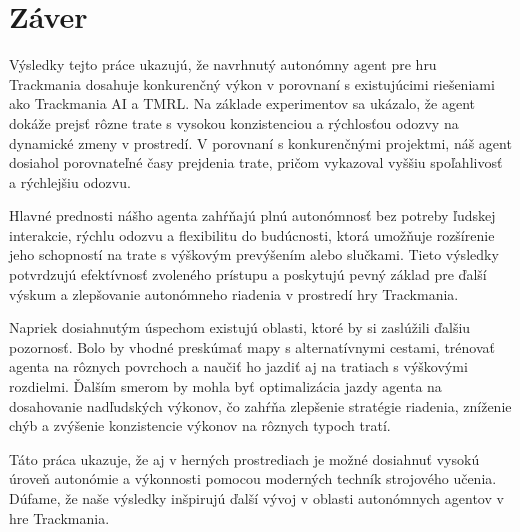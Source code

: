 \chapter*{Záver}  %

Výsledky tejto práce ukazujú, že navrhnutý autonómny agent pre hru Trackmania dosahuje konkurenčný výkon v porovnaní s existujúcimi riešeniami ako Trackmania AI a TMRL. Na základe experimentov sa ukázalo, že agent dokáže prejsť rôzne trate s vysokou konzistenciou a rýchlosťou odozvy na dynamické zmeny v prostredí. V porovnaní s konkurenčnými projektmi, náš agent dosiahol porovnateľné časy prejdenia trate, pričom vykazoval vyššiu spoľahlivosť a rýchlejšiu odozvu.

Hlavné prednosti nášho agenta zahŕňajú plnú autonómnosť bez potreby ľudskej interakcie, rýchlu odozvu a flexibilitu do budúcnosti, ktorá umožňuje rozšírenie jeho schopností na trate s výškovým prevýšením alebo slučkami. Tieto výsledky potvrdzujú efektívnosť zvoleného prístupu a poskytujú pevný základ pre ďalší výskum a zlepšovanie autonómneho riadenia v prostredí hry Trackmania.

Napriek dosiahnutým úspechom existujú oblasti, ktoré by si zaslúžili ďalšiu pozornosť. Bolo by vhodné preskúmať mapy s alternatívnymi cestami, trénovať agenta na rôznych povrchoch a naučiť ho jazdiť aj na tratiach s výškovými rozdielmi. Ďalším smerom by mohla byť optimalizácia jazdy agenta na dosahovanie nadľudských výkonov, čo zahŕňa zlepšenie stratégie riadenia, zníženie chýb a zvýšenie konzistencie výkonov na rôznych typoch tratí. 

Táto práca ukazuje, že aj v herných prostrediach je možné dosiahnuť vysokú úroveň autonómie a výkonnosti pomocou moderných techník strojového učenia. Dúfame, že naše výsledky inšpirujú ďalší vývoj v oblasti autonómnych agentov v hre Trackmania.

